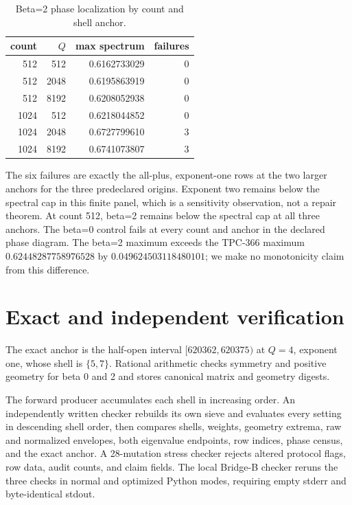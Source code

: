 \documentclass[10pt]{article}
\begin{document}
\begin{table}[t]
\centering
\caption{Beta=2 phase localization by count and shell anchor.}
\label{tab:phase}
\small
\begin{tabular}{r r r r}
\toprule
count & $Q$ & max spectrum & failures\\
\midrule
512  & 512  & 0.6162733029 & 0\\
512  & 2048 & 0.6195863919 & 0\\
512  & 8192 & 0.6208052938 & 0\\
1024 & 512  & 0.6218044852 & 0\\
1024 & 2048 & 0.6727799610 & 3\\
1024 & 8192 & 0.6741073807 & 3\\
\bottomrule
\end{tabular}
\end{table}

The six failures are exactly the all-plus, exponent-one rows at the two
larger anchors for the three predeclared origins.  Exponent two remains below
the spectral cap in this finite panel, which is a sensitivity observation,
not a repair theorem.  At count 512, beta=2 remains below the spectral cap at
all three anchors.  The beta=0 control fails at every count and anchor in the
declared phase diagram.  The beta=2 maximum exceeds the TPC-366 maximum
$0.62448287758976528$ by $0.049624503118480101$; we make no monotonicity
claim from this difference.

\section{Exact and independent verification}

The exact anchor is the half-open interval $[620362,620375)$ at $Q=4$,
exponent one, whose shell is $\{5,7\}$.  Rational arithmetic checks symmetry
and positive geometry for beta 0 and 2 and stores canonical matrix and
geometry digests.

The forward producer accumulates each shell in increasing order.  An
independently written checker rebuilds its own sieve and evaluates every
setting in descending shell order, then compares shells, weights, geometry
extrema, raw and normalized envelopes, both eigenvalue endpoints, row
indices, phase census, and the exact anchor.  A 28-mutation stress checker
rejects altered protocol flags, row data, audit counts, and claim fields.
The local Bridge-B checker reruns the three checks in normal and optimized
Python modes, requiring empty stderr and byte-identical stdout.
\end{document}
